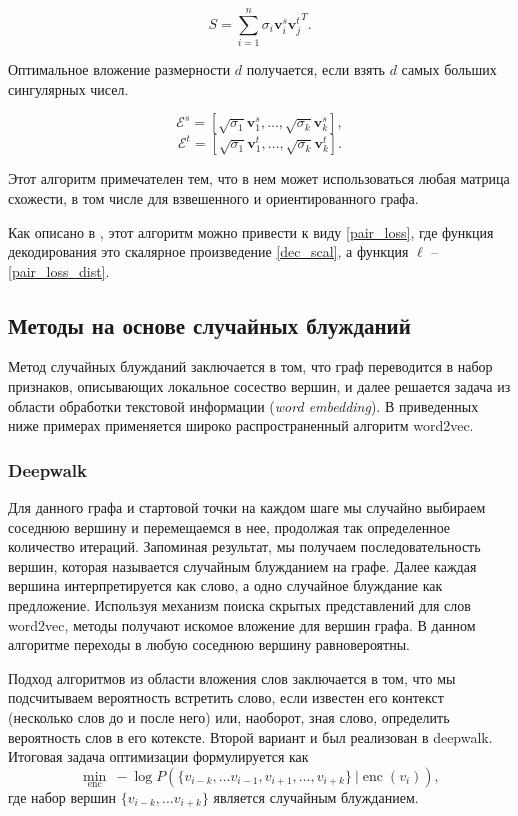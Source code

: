 \documentclass[12pt,a4paper]{extarticle}
\newcommand{\E}{\mathcal{E}}
\newcommand{\encoder}{\operatorname{enc}}
\begin{document}
    \[
    S = \sum_{i=1}^{n} \sigma_i \mathbf{v}_i^s {\mathbf{v}_j^t}^T.
    \]
    
    Оптимальное вложение размерности $d$ получается, если взять $d$ самых больших сингулярных чисел.
    
    \[
    \E^s = [ \sqrt{\sigma_1} \mathbf{v}_1^s, \ldots, \sqrt{\sigma_k} \mathbf{v}_k^s],
    \]
    \[
    \E^t = [ \sqrt{\sigma_1} \mathbf{v}_1^t, \ldots, \sqrt{\sigma_k} \mathbf{v}_k^t].
    \]
    
    Этот алгоритм примечателен тем, что в нем может использоваться любая матрица схожести, в том числе для взвешенного и ориентированного графа.
    
    Как описано в \cite{survey2}, этот алгоритм можно привести к виду \eqref{pair_loss}, где функция декодирования это скалярное произведение \eqref{dec_scal}, а функция $\ell$ -- \eqref{pair_loss_dist}.
    
    \subsection{Методы на основе случайных блужданий}
    Метод случайных блужданий заключается в том, что граф переводится в набор признаков, описывающих локальное сосество вершин, и далее решается задача из области обработки текстовой информации (\textit{word embedding}). В приведенных ниже примерах применяется широко распространенный алгоритм word2vec.
    
    \subsubsection{Deepwalk \cite{deepwalk}}
    Для данного графа и стартовой точки на каждом шаге мы случайно выбираем соседнюю вершину и перемещаемся в нее, продолжая так определенное количество итераций.
    Запоминая результат, мы получаем последовательность вершин, которая называется случайным блужданием на графе.
    Далее каждая вершина интерпретируется как слово, а одно случайное блуждание как предложение.
    Используя механизм поиска скрытых представлений для слов word2vec, методы получают искомое вложение для вершин графа.
    В данном алгоритме переходы в любую соседнюю вершину равновероятны.
    
    Подход алгоритмов из области вложения слов заключается в том, что мы подсчитываем вероятность встретить слово, если известен его контекст (несколько слов до и после него) или, наоборот, зная слово, определить вероятность слов в его котексте. Второй вариант и был реализован в deepwalk. Итоговая задача оптимизации формулируется как
    \[
    \min_{\encoder}\ - \log P(\{v_{i-k}, \dots v_{i-1}, v_{i+1}, \dots, v_{i+k}\}\ | \encoder(v_i)),
    \]
    где набор вершин $\{v_{i-k}, \dots v_{i+k}\}$ является случайным блужданием.
    
\end{document}
